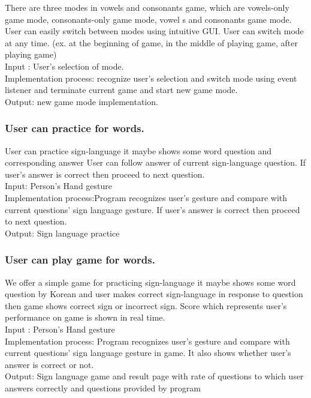 \documentclass[10pt,journal,compsoc]{IEEEtran}
\begin{document}
There are three modes in vowels and consonants game, which are vowels-only game mode, consonants-only game mode, vowel s and consonants game mode. User can easily switch between modes using intuitive GUI. User can switch mode at any time.
(ex. at the beginning of game, in the middle of playing game, after playing game)
\\Input : User’s selection of mode.
\\Implementation process: recognize user’s selection and switch mode using event listener and terminate current game and start new game mode.
\\Output: new game mode implementation.

\subsubsection{User can practice for words.}

User can practice sign-language it maybe shows some word question and corresponding answer User can follow answer of current sign-language question. If user’s answer is correct then proceed to next question.
\\Input: Person's Hand gesture
\\Implementation process:Program recognizes user’s gesture and compare with current questions’ sign language gesture. If user’s answer is correct then proceed to next question.
\\Output: Sign language practice



\subsubsection{User can play game for words.\\}
We offer a simple game for practicing sign-language it maybe shows some word question by Korean and user makes correct sign-language in response to question then game shows correct sign or incorrect sign.
Score which represents user’s performance on game is shown in real time.
\\Input : Person's Hand gesture
\\Implementation process: Program recognizes user’s gesture and compare with current questions’ sign language gesture in game. It also shows whether user’s answer is correct or not.
\\Output: Sign language game and result page with rate of questions to which user answers correctly and questions provided by program
\end{document}
